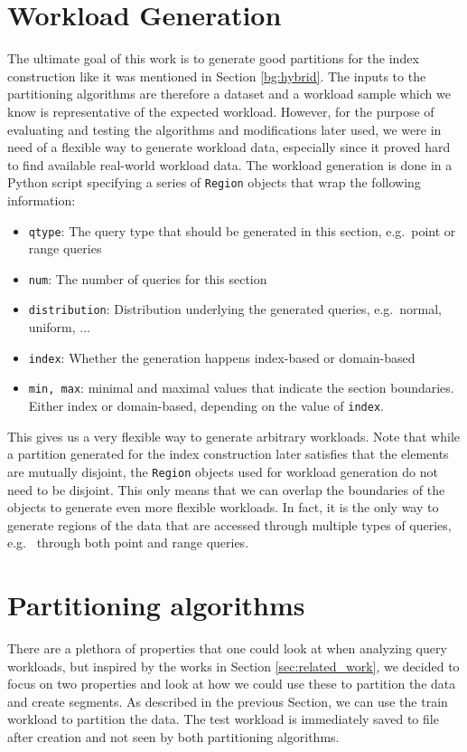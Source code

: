 \section{Workload Generation}
The ultimate goal of this work is to generate good partitions for the index construction like it was mentioned in Section \ref{bg:hybrid}. The inputs to the partitioning algorithms are therefore a dataset and a workload sample which we know is representative of the expected workload. However, for the purpose of evaluating and testing the algorithms and modifications later used, we were in need of a flexible way to generate workload data, especially since it proved hard to find available real-world workload data. The workload generation is done in a Python script specifying a series of \verb|Region| objects that wrap the following information:

\begin{itemize}
    \item \verb|qtype|: The query type that should be generated in this section, e.g.~point or range queries
    \item \verb|num|: The number of queries for this section
    \item \verb|distribution|: Distribution underlying the generated queries, e.g.~normal, uniform, ...
    \item \verb|index|: Whether the generation happens index-based or domain-based
    \item \verb|min, max|: minimal and maximal values that indicate the section boundaries. Either index or domain-based, depending on the value of \verb|index|.
\end{itemize}

This gives us a very flexible way to generate arbitrary workloads. Note that while a partition generated for the index construction later satisfies that the elements are mutually disjoint, the \verb|Region| objects used for workload generation do not need to be disjoint. This only means that we can overlap the boundaries of the objects to generate even more flexible workloads. In fact, it is the only way to generate regions of the data that are accessed through multiple types of queries, e.g.~ through both point and range queries. 

\section{Partitioning algorithms}
There are a plethora of properties that one could look at when analyzing query workloads, but inspired by the works in Section \ref{sec:related_work}, we decided to focus on two properties and look at how we could use these to partition the data and create segments. As described in the previous Section, we can use the train workload to partition the data. The test workload is immediately saved to file after creation and not seen by both partitioning algorithms. 

